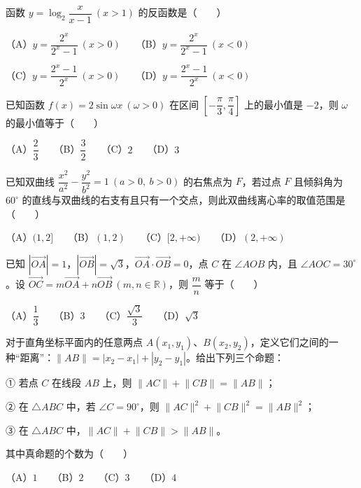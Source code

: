 \begin{question}
函数 $y=\log_2\dfrac{x}{x-1}\ (x>1)$ 的反函数是\mbox{（　　）}

（A）$y=\dfrac{2^x}{2^x-1}\ (x>0)$　　（B）$y=\dfrac{2^x}{2^x-1}\ (x<0)$

（C）$y=\dfrac{2^x-1}{2^x}\ (x>0)$　　（D）$y=\dfrac{2^x-1}{2^x}\ (x<0)$

\end{question}
\begin{question}
已知函数 $f(x)=2\sin\omega x\ (\omega>0)$ 在区间 $\left[-\dfrac\pi3,\dfrac\pi4\right]$ 上的最小值是 $-2$，则 $\omega$ 的最小值等于\mbox{（　　）}

（A）$\dfrac23$　　（B）$\dfrac32$　　（C）$2$　　（D）$3$

\end{question}
\begin{question}
已知双曲线 $\dfrac{x^2}{a^2}-\dfrac{y^2}{b^2}=1\ (a>0,\ b>0)$ 的右焦点为 $F$，若过点 $F$ 且倾斜角为 $60^\circ$ 的直线与双曲线的右支有且只有一个交点，则此双曲线离心率的取值范围是\mbox{（　　）}

（A）$(1,2]$　　（B）$(1,2)$　　（C）$[2,+\infty)$　　（D）$(2,+\infty)$

\end{question}
\begin{question}
已知 $|\overrightarrow{OA}|=1$，$|\overrightarrow{OB}|=\sqrt3$，$\overrightarrow{OA}\cdot\overrightarrow{OB}=0$，点 $C$ 在 $\angle AOB$ 内，且 $\angle AOC=30^\circ$。设 $\overrightarrow{OC}=m\overrightarrow{OA}+n\overrightarrow{OB}\ (m,n\in\mathbb R)$，则 $\dfrac mn$ 等于\mbox{（　　）}

（A）$\dfrac13$　　（B）$3$　　（C）$\dfrac{\sqrt3}{3}$　　（D）$\sqrt3$

\end{question}
\begin{question}
对于直角坐标平面内的任意两点 $A(x_1,y_1)$、$B(x_2,y_2)$，定义它们之间的一种“距离”：$\lVert AB\rVert=|x_2-x_1|+|y_2-y_1|$。给出下列三个命题：

① 若点 $C$ 在线段 $AB$ 上，则 $\lVert AC\rVert+\lVert CB\rVert=\lVert AB\rVert$；

② 在 $\triangle ABC$ 中，若 $\angle C=90^\circ$，则 $\lVert AC\rVert^2+\lVert CB\rVert^2=\lVert AB\rVert^2$；

③ 在 $\triangle ABC$ 中，$\lVert AC\rVert+\lVert CB\rVert>\lVert AB\rVert$。

其中真命题的个数为\mbox{（　　）}

（A）$1$　　（B）$2$　　（C）$3$　　（D）$4$

\end{question}


